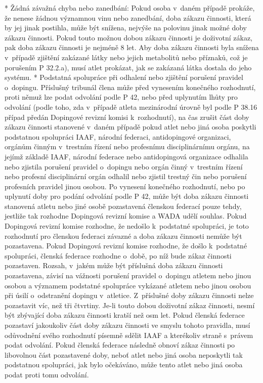   * Žádná závažná chyba nebo zanedbání: Pokud osoba v~daném případě  prokáže, že nenese žádnou významnou vinu nebo zanedbání, doba zákazu činnosti, která by jej jinak postihla, může být snížena, nejvýše na polovinu jinak možné doby zákazu činnosti. Pokud touto možnou dobou zákazu činnosti je doživotní zákaz, pak doba zákazu činnosti je nejméně 8 let. Aby doba zákazu činnosti byla snížena v~případě zjištění zakázané látky nebo jejich metabolitů  nebo příznaků, což je porušením P 32.2.a), musí atlet prokázat, jak se zakázaná látka dostala do jeho systému.
  * Podstatná spolupráce při odhalení nebo zjištění porušení pravidel o~dopingu. Příslušný tribunál člena může před vynesením konečného rozhodnutí, proti němuž lze podat odvolání podle P 42, nebo před uplynutím lhůty pro odvolání (podle toho, zda v~případě atleta mezinárodní úrovně byl podle P 38.16 případ předán Dopingové revizní komisi k~rozhodnutí), na čas zrušit část doby zákazu činnosti stanovené v~daném případě pokud atlet nebo jiná osoba poskytli podstatnou spolupráci IAAF, národní federaci, antidopingové organizaci, orgánům činným v~trestním řízení nebo profesnímu disciplinárnímu orgánu, na jejímž základě IAAF, národní federace nebo antidopingová organizace odhalila nebo zjistila porušení pravidel o~dopingu nebo orgán činný v~trestním řízení nebo profesní disciplinární orgán odhalil nebo zjistil trestný čin nebo porušení profesních pravidel jinou osobou. Po vynesení konečného rozhodnutí, nebo po uplynutí doby pro podání odvolání podle P 42, může být doba zákazu činnosti stanovená atletu nebo jiné osobě pozastavená členskou federací pouze tehdy, jestliže tak rozhodne Dopingová revizní komise a WADA udělí souhlas. Pokud Dopingová revizní komise rozhodne, že nedošlo k~podstatné spolupráci, je toto rozhodnutí pro členskou federaci závazné a doba zákazu činnosti nemůže být pozastavena. Pokud Dopingová revizní komise rozhodne, že došlo k~podstatné spolupráci, členská federace rozhodne o~době, po níž bude zákaz činnosti pozastaven. Rozsah, v~jakém může být příslušná doba zákazu činnosti pozastavena, závisí na vážnosti porušení pravidel o~dopingu atletem nebo jinou osobou a významem podstatné spolupráce vykázané atletem nebo jinou osobou při úsilí o~odstranění dopingu v~atletice. Z~příslušné doby zákazu činnosti nelze pozastavit víc, než tři čtvrtiny. Je-li touto dobou doživotní zákaz činnosti, nesmí být zbývající doba zákazu činnosti kratší než osm let.  Pokud členská federace pozastaví jakoukoliv část doby zákazu činnosti ve smyslu tohoto pravidla, musí odůvodnění svého rozhodnutí písemně sdělit IAAF a kterékoliv straně s~právem podat odvolání. Pokud členská federace následně obnoví zákaz činnosti po libovolnou část pozastavené doby, neboť atlet nebo jiná osoba neposkytli tak podstatnou spolupráci, jak bylo očekáváno, může tento atlet nebo jiná osoba podat proti tomu odvolání.
